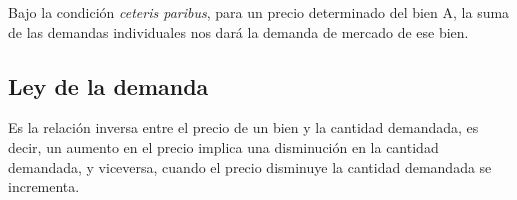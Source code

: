 Bajo la condición \textit{ceteris paribus},
para un precio determinado del bien A,
la suma de las demandas individuales nos dará la demanda de mercado de ese bien.

\subsection{Ley de la demanda}

Es la relación inversa entre el precio de un bien y la cantidad demandada,
es decir,
un aumento en el precio implica una disminución en la cantidad demandada,
y viceversa,
cuando el precio disminuye la cantidad demandada se incrementa.
